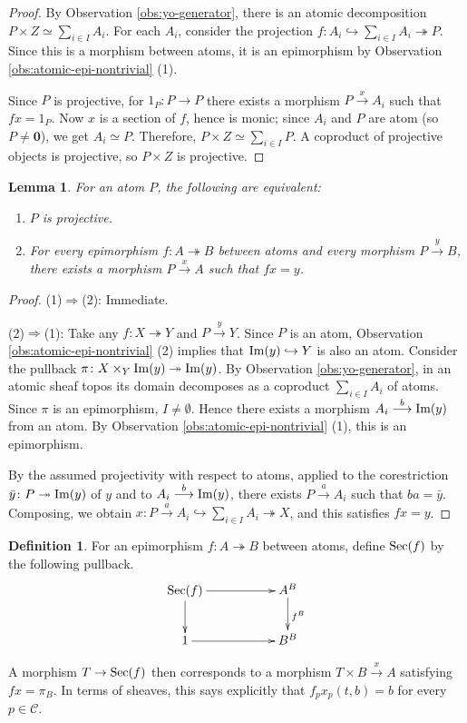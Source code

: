 \documentclass[10pt]{amsart}
\numberwithin{equation}{section}
\theoremstyle{plain}
\newtheorem{lemma}[theorem]{Lemma}
\theoremstyle{definition}
\newtheorem{definition}[theorem]{Definition}
\newcommand{\C}{\mathcal{C}}
\newcommand{\surj}{\twoheadrightarrow}
\newcommand{\embed}{\hookrightarrow}
\newcommand{\edge}[1]{\overset{#1}{\longrightarrow}}
\begin{document}
\begin{proof}
By Observation \ref{obs:yo-generator}, there is an atomic decomposition $P\times Z\simeq\sum_{i\in I}A_i$.
For each $A_i$, consider the projection $f\colon A_i\embed\sum_{i\in I}A_i\surj P$.
Since this is a morphism between atoms, it is an epimorphism by Observation \ref{obs:atomic-epi-nontrivial} (1).

Since $P$ is projective, for $1_P\colon P\to P$ there exists a morphism $P\edge{x} A_i$ such that $fx=1_P$.
Now $x$ is a section of $f$, hence is monic; since $A_i$ and $P$ are atom (so $P\not=\mathbf{0}$), we get $A_i\simeq P$.
Therefore, $P\times Z\simeq\sum_{i\in I}P$.
A coproduct of projective objects is projective, so $P\times Z$ is projective.
\end{proof}

\begin{lemma}\label{lem:atomic-projective}
For an atom $P$, the following are equivalent:
\begin{enumerate}
\item $P$ is projective.
\item For every epimorphism $f\colon A\surj B$ between atoms and every morphism $P\edge{y}B$, there exists a morphism $P\edge{x}A$ such that $fx=y$.
\end{enumerate}
\end{lemma}

\begin{proof}
(1)$\Rightarrow$(2):
Immediate.

(2)$\Rightarrow$(1):
Take any $f\colon X\surj Y$ and $P\edge{y}Y$.
Since $P$ is an atom, Observation \ref{obs:atomic-epi-nontrivial} (2) implies that ${\rm Im}(y)\embed Y$ is also an atom.
Consider the pullback $\pi\colon X\times_Y{\rm Im}(y)\surj {\rm Im}(y)$.
By Observation \ref{obs:yo-generator}, in an atomic sheaf topos its domain decomposes as a coproduct $\sum_{i\in I}A_i$ of atoms.
Since $\pi$ is an epimorphism, $I\not=\emptyset$.
Hence there exists a morphism $A_i\edge{b}{\rm Im}(y)$ from an atom.
By Observation \ref{obs:atomic-epi-nontrivial} (1), this is an epimorphism.

By the assumed projectivity with respect to atoms, applied to the corestriction $\bar{y}\colon P\surj {\rm Im}(y)$ of $y$ and to $A_i\edge{b} {\rm Im}(y)$, there exists $P\edge{a}A_i$ such that $ba=\bar{y}$.
Composing, we obtain $x\colon P\edge{a}A_i\embed \sum_{i\in I}A_i\surj X$, and this satisfies $fx=y$.
\end{proof}

\begin{definition}
For an epimorphism $f\colon A\surj B$ between atoms, define ${\rm Sec}(f)$ by the following pullback.
\[
\xymatrix{
{\rm Sec}(f) \ar[rr]\ar[d] & & A^B \ar[d]^{f^B} \\
1 \ar[rr] & & B^B 
}
\]

A morphism $T\to {\rm Sec}(f)$ then corresponds to a morphism $T\times B\edge{x} A$ satisfying $fx=\pi_B$.
In terms of sheaves, this says explicitly that $f_px_p(t,b)=b$ for every $p\in\C$.
\end{definition}
\end{document}
